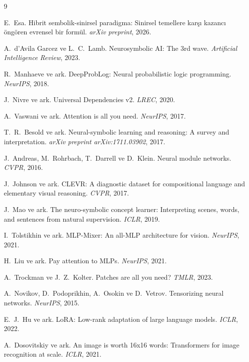 \documentclass[11pt,a4paper]{article}
\begin{document}

\begin{thebibliography}{9}

E.~Esa. Hibrit sembolik-sinirsel paradigma: Sinirsel temellere karşı
kazancı öngören evrensel bir formül. \emph{arXiv preprint}, 2026.

A.~d'Avila Garcez ve L.~C.~Lamb. Neurosymbolic AI: The 3rd wave.
\emph{Artificial Intelligence Review}, 2023.

R.~Manhaeve ve ark. DeepProbLog: Neural probabilistic logic programming.
\emph{NeurIPS}, 2018.

J.~Nivre ve ark. Universal Dependencies v2. \emph{LREC}, 2020.

A.~Vaswani ve ark. Attention is all you need. \emph{NeurIPS}, 2017.

T.~R.~Besold ve ark. Neural-symbolic learning and reasoning: A survey
and interpretation. \emph{arXiv preprint arXiv:1711.03902}, 2017.

J.~Andreas, M.~Rohrbach, T.~Darrell ve D.~Klein. Neural module
networks. \emph{CVPR}, 2016.

J.~Johnson ve ark. CLEVR: A diagnostic dataset for compositional
language and elementary visual reasoning. \emph{CVPR}, 2017.

J.~Mao ve ark. The neuro-symbolic concept learner: Interpreting
scenes, words, and sentences from natural supervision. \emph{ICLR}, 2019.

I.~Tolstikhin ve ark. MLP-Mixer: An all-MLP architecture for vision.
\emph{NeurIPS}, 2021.

H.~Liu ve ark. Pay attention to MLPs. \emph{NeurIPS}, 2021.

A.~Trockman ve J.~Z.~Kolter. Patches are all you need?
\emph{TMLR}, 2023.

A.~Novikov, D.~Podoprikhin, A.~Osokin ve D.~Vetrov. Tensorizing
neural networks. \emph{NeurIPS}, 2015.

E.~J.~Hu ve ark. LoRA: Low-rank adaptation of large language models.
\emph{ICLR}, 2022.

A.~Dosovitskiy ve ark. An image is worth 16x16 words: Transformers
for image recognition at scale. \emph{ICLR}, 2021.


\end{thebibliography}
\end{document}
